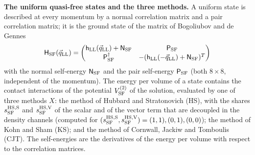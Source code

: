 \documentclass[
  10pt,
]{article}
\begin{document}
\textbf{The uniform quasi-free states and the three methods.} A uniform
state is described at every momentum by a normal correlation matrix and
a pair correlation matrix; it is the ground state of the matrix of
Bogoliubov and de Gennes
\[\mathsf H_{\rm SF}(\vec q_{\rm LL})=\begin{pmatrix}\mathsf h_{\rm LL}(\vec q_{\rm LL})+\mathsf N_{\rm SF}&\mathsf P_{\rm SF}\\\mathsf P_{\rm SF}^\dagger&-(\mathsf h_{\rm LL}(-\vec q_{\rm LL})+\mathsf N_{\rm SF})^T\end{pmatrix}\]
with the normal self-energy \(\mathsf N_{\rm SF}\) and the pair
self-energy \(\mathsf P_{\rm SF}\) (both \(8\times8\), independent of
the momentum). The energy per volume of a state contains the contact
interactions of the potential \(V^{(2)}_{\rm SF}\) of the solution,
evaluated by one of three methods \(X\): the method of Hubbard and
Stratonovich (HS), with the shares \(s^{\rm HS,S}_{\rm SF}\) and
\(s^{\rm HS,V}_{\rm SF}\) of the scalar and of the vector term that are
decoupled in the density channels (computed for
\((s^{\rm HS,S}_{\rm SF},s^{\rm HS,V}_{\rm SF})=(1,1),(0,1),(0,0)\));
the method of Kohn and Sham (KS); and the method of Cornwall, Jackiw and
Tomboulis (CJT). The self-energies are the derivatives of the energy per
volume with respect to the correlation matrices.
\end{document}
